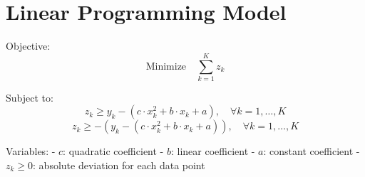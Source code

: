 \documentclass{article}
\begin{document}
\section*{Linear Programming Model}

Objective:
\[
\text{Minimize} \quad \sum_{k=1}^{K} z_k
\]

Subject to:
\[
z_k \geq y_k - (c \cdot x_k^2 + b \cdot x_k + a), \quad \forall k = 1, \ldots, K
\]
\[
z_k \geq -(y_k - (c \cdot x_k^2 + b \cdot x_k + a)), \quad \forall k = 1, \ldots, K
\]

Variables:
- \( c \): quadratic coefficient
- \( b \): linear coefficient
- \( a \): constant coefficient
- \( z_k \geq 0 \): absolute deviation for each data point
\end{document}
